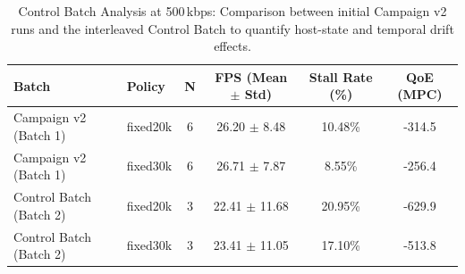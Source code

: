 \begin{table}[t]
\centering
\caption{Control Batch Analysis at 500\,kbps: Comparison between initial Campaign v2 runs and the interleaved Control Batch to quantify host-state and temporal drift effects.}
\label{tab:control_batch}
\small
\begin{tabular}{llcccc}
\toprule
\textbf{Batch} & \textbf{Policy} & \textbf{N} & \textbf{FPS (Mean $\pm$ Std)} & \textbf{Stall Rate (\%)} & \textbf{QoE (MPC)} \\
\midrule
Campaign v2 (Batch 1) & fixed20k & 6 & 26.20 $\pm$ 8.48 & 10.48\% & -314.5 \\
Campaign v2 (Batch 1) & fixed30k & 6 & 26.71 $\pm$ 7.87 & 8.55\% & -256.4 \\
Control Batch (Batch 2) & fixed20k & 3 & 22.41 $\pm$ 11.68 & 20.95\% & -629.9 \\
Control Batch (Batch 2) & fixed30k & 3 & 23.41 $\pm$ 11.05 & 17.10\% & -513.8 \\
\bottomrule
\end{tabular}
\end{table}